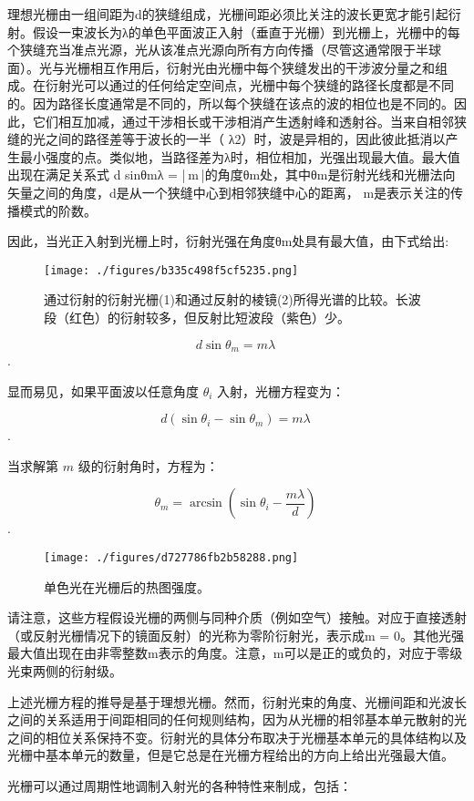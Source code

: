 理想光栅由一组间距为d的狭缝组成，光栅间距必须比关注的波长更宽才能引起衍射。假设一束波长为λ的单色平面波正入射（垂直于光栅）到光栅上，光栅中的每个狭缝充当准点光源，光从该准点光源向所有方向传播（尽管这通常限于半球面）。光与光栅相互作用后，衍射光由光栅中每个狭缝发出的干涉波分量之和组成。在衍射光可以通过的任何给定空间点，光栅中每个狭缝的路径长度都是不同的。因为路径长度通常是不同的，所以每个狭缝在该点的波的相位也是不同的。因此，它们相互加减，通过干涉相长或干涉相消产生透射峰和透射谷。当来自相邻狭缝的光之间的路径差等于波长的一半（ λ2）时，波是异相的，因此彼此抵消以产生最小强度的点。类似地，当路径差为λ时，相位相加，光强出现最大值。最大值出现在满足关系式 d sinθmλ = | m |的角度θm处，其中θm是衍射光线和光栅法向矢量之间的角度，d是从一个狭缝中心到相邻狭缝中心的距离， m是表示关注的传播模式的阶数。

因此，当光正入射到光栅上时，衍射光强在角度θm处具有最大值，由下式给出:

\begin{figure}[ht]
\centering
\texttt{[image: ./figures/b335c498f5cf5235.png]}
\caption{通过衍射的衍射光栅(1)和通过反射的棱镜(2)所得光谱的比较。长波段（红色）的衍射较多，但反射比短波段（紫色）少。} \label{fig_YSGS_2}
\end{figure}

$$ d \sin \theta_m = m \lambda~$$.

显而易见，如果平面波以任意角度 $\theta_i$ 入射，光栅方程变为：

$$d (\sin \theta_i - \sin \theta_m) = m \lambda~$$.

当求解第 $m$ 级的衍射角时，方程为：

$$\theta_m = \arcsin \left( \sin \theta_i - \frac{m \lambda}{d} \right)~$$.
\begin{figure}[ht]
\centering
\texttt{[image: ./figures/d727786fb2b58288.png]}
\caption{单色光在光栅后的热图强度。} \label{fig_YSGS_3}
\end{figure}
请注意，这些方程假设光栅的两侧与同种介质（例如空气）接触。对应于直接透射（或反射光栅情况下的镜面反射）的光称为零阶衍射光，表示成m = 0。其他光强最大值出现在由非零整数m表示的角度。注意，m可以是正的或负的，对应于零级光束两侧的衍射级。

上述光栅方程的推导是基于理想光栅。然而，衍射光束的角度、光栅间距和光波长之间的关系适用于间距相同的任何规则结构，因为从光栅的相邻基本单元散射的光之间的相位关系保持不变。衍射光的具体分布取决于光栅基本单元的具体结构以及光栅中基本单元的数量，但是它总是在光栅方程给出的方向上给出光强最大值。

光栅可以通过周期性地调制入射光的各种特性来制成，包括：

